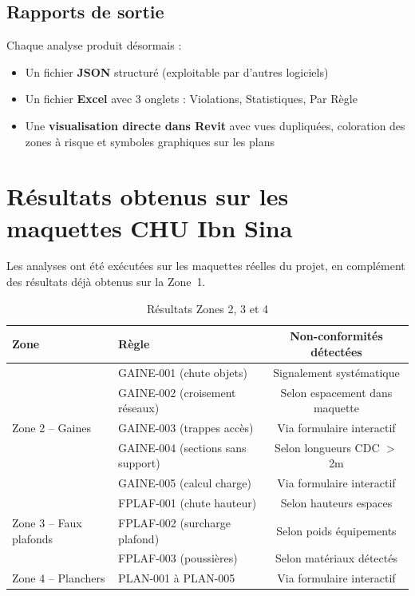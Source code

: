 \documentclass[a4paper,12pt]{article}
\begin{document}
\subsection{Rapports de sortie}

Chaque analyse produit désormais :

\begin{itemize}
    \item Un fichier \textbf{JSON} structuré (exploitable par d'autres logiciels)
    \item Un fichier \textbf{Excel} avec 3 onglets : Violations, Statistiques, Par Règle
    \item Une \textbf{visualisation directe dans Revit} avec vues dupliquées, coloration des zones à risque et symboles graphiques sur les plans
\end{itemize}

\section{Résultats obtenus sur les maquettes CHU Ibn Sina}

Les analyses ont été exécutées sur les maquettes réelles du projet, en complément des résultats déjà obtenus sur la Zone~1.

\begin{table}[h!]
\centering
\begin{tabular}{llc}
\toprule
\textbf{Zone} & \textbf{Règle} & \textbf{Non-conformités détectées} \\
\midrule
\multirow{5}{*}{Zone 2 -- Gaines}
 & GAINE-001 (chute objets)          & Signalement systématique \\
 & GAINE-002 (croisement réseaux)    & Selon espacement dans maquette \\
 & GAINE-003 (trappes accès)         & Via formulaire interactif \\
 & GAINE-004 (sections sans support) & Selon longueurs CDC $>$ 2m \\
 & GAINE-005 (calcul charge)         & Via formulaire interactif \\
\midrule
\multirow{3}{*}{Zone 3 -- Faux plafonds}
 & FPLAF-001 (chute hauteur)         & Selon hauteurs espaces \\
 & FPLAF-002 (surcharge plafond)     & Selon poids équipements \\
 & FPLAF-003 (poussières)            & Selon matériaux détectés \\
\midrule
\multirow{5}{*}{Zone 4 -- Planchers}
 & PLAN-001 à PLAN-005               & Via formulaire interactif \\
\bottomrule
\end{tabular}
\caption{Résultats Zones 2, 3 et 4}
\end{table}
\end{document}
